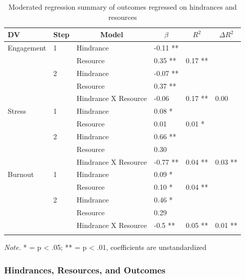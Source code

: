 \documentclass[
  man]{apa7}
\begin{document}
\begin{table}[tbp]

\begin{center}
\begin{threeparttable}

\caption{\label{tab:hind-resource-table}Moderated regression summary of outcomes regressed on hindrances and resources}

\begin{tabular}{llllll}
\toprule
DV & \multicolumn{1}{c}{Step} & \multicolumn{1}{c}{Model} & \multicolumn{1}{c}{$\beta$} & \multicolumn{1}{c}{$R^2$} & \multicolumn{1}{c}{$\Delta R^2$}\\
\midrule
Engagement & 1 & Hindrance & -0.11 ** &  & \\
 &  & Resource & 0.35 ** & 0.17 ** & \\
 & 2 & Hindrance & -0.07 ** &  & \\
 &  & Resource & 0.37 ** &  & \\
 &  & Hindrance X Resource & -0.06 & 0.17 ** & 0.00\\
Stress & 1 & Hindrance & 0.08 * &  & \\
 &  & Resource & 0.01 & 0.01 * & \\
 & 2 & Hindrance & 0.66 ** &  & \\
 &  & Resource & 0.30 &  & \\
 &  & Hindrance X Resource & -0.77 ** & 0.04 ** & 0.03 **\\
Burnout & 1 & Hindrance & 0.09 * &  & \\
 &  & Resource & 0.10 * & 0.04 ** & \\
 & 2 & Hindrance & 0.46 * &  & \\
 &  & Resource & 0.29 &  & \\
 &  & Hindrance X Resource & -0.5 ** & 0.05 ** & 0.01 **\\
\bottomrule
\addlinespace
\end{tabular}

\begin{tablenotes}[para]
\normalsize{\textit{Note.} * = p < .05; ** = p < .01, coefficients are unstandardized}
\end{tablenotes}

\end{threeparttable}
\end{center}

\end{table}

\subsubsection{Hindrances, Resources, and Outcomes}\label{hindrances-resources-and-outcomes}
\end{document}

